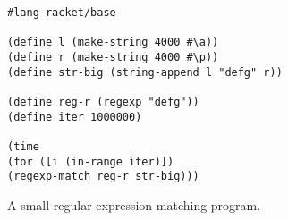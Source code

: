 \begin{figure}[!htbp]
	\centering
	\begin{minipage}{0.4\textwidth}
		\begin{lstlisting}[language=racket, basicstyle=\ttfamily\scriptsize]
#lang racket/base

(define l (make-string 4000 #\a))
(define r (make-string 4000 #\p))
(define str-big (string-append l "defg" r))

(define reg-r (regexp "defg"))
(define iter 1000000)

(time
(for ([i (in-range iter)])
(regexp-match reg-r str-big)))
		\end{lstlisting}
	\end{minipage}
\caption{\small A small regular expression matching program.}
\label{fig:regexp-example-defg}
\end{figure}